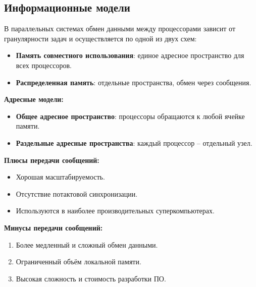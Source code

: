 	\subsection{Информационные модели}
	В параллельных системах обмен данными между процессорами зависит от гранулярности задач и осуществляется по одной из двух схем:
	\begin{itemize}
		\item \textbf{Память совместного использования}: единое адресное пространство для всех процессоров.
		\item \textbf{Распределенная память}: отдельные пространства, обмен через сообщения.
	\end{itemize}
	
	\textbf{Адресные модели:}
	\begin{itemize}
		\item \textbf{Общее адресное пространство}: процессоры обращаются к любой ячейке памяти.
		\item \textbf{Раздельные адресные пространства}: каждый процессор -- отдельный узел.
	\end{itemize}
	
	\newpage
	
	\textbf{Плюсы передачи сообщений:}
	\begin{itemize}
		\item Хорошая масштабируемость.
		\item Отсутствие потактовой синхронизации.
		\item Используются в наиболее производительных суперкомпьютерах.
	\end{itemize}
	
	\textbf{Минусы передачи сообщений:}
	\begin{enumerate}
		\item Более медленный и сложный обмен данными.
		\item Ограниченный объём локальной памяти.
		\item Высокая сложность и стоимость разработки ПО.
	\end{enumerate}
	
